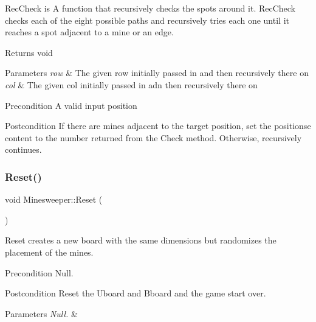 Rec\+Check is A function that recursively checks the spots around it. Rec\+Check checks each of the eight possible paths and recursively tries each one until it reaches a spot adjacent to a mine or an edge. 

\begin{DoxyReturn}{Returns}
void 
\end{DoxyReturn}

\begin{DoxyParams}{Parameters}
{\em row} & The given row initially passed in and then recursively there on \\
\hline
{\em col} & The given col initially passed in adn then recursively there on \\
\hline
\end{DoxyParams}
\begin{DoxyPrecond}{Precondition}
A valid input position 
\end{DoxyPrecond}
\begin{DoxyPostcond}{Postcondition}
If there are mines adjacent to the target position, set the position\textquotesingle{}se content to the number returned from the Check method. Otherwise, recursively continues. 
\end{DoxyPostcond}
\mbox{\label{classMinesweeper_a7bb8b53ca69cd4959e5123a07047702f}} 
\subsubsection{\texorpdfstring{Reset()}{Reset()}}
{\footnotesize\ttfamily void Minesweeper\+::\+Reset (\begin{DoxyParamCaption}{ }\end{DoxyParamCaption})}



Reset creates a new board with the same dimensions but randomizes the placement of the mines. 

\begin{DoxyPrecond}{Precondition}
Null. 
\end{DoxyPrecond}
\begin{DoxyPostcond}{Postcondition}
Reset the Uboard and Bboard and the game start over. 
\end{DoxyPostcond}

\begin{DoxyParams}{Parameters}
{\em Null.} & \\
\hline
\end{DoxyParams}
\mbox{\label{classMinesweeper_a4da8ec9ff58f3e663eed64ab70d523be}} 
